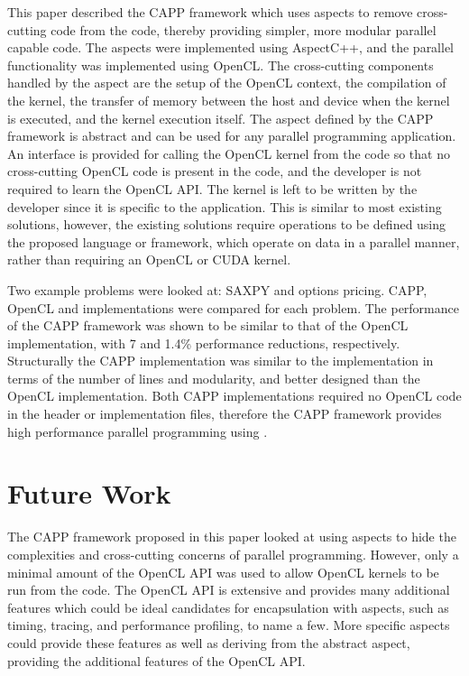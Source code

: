 \documentclass{sig-alternate-05-2015}
\begin{document}
This paper described the  CAPP framework which uses aspects to remove
cross-cutting code from the \CPP code, thereby providing simpler, more modular
parallel capable \CPP code. The aspects were implemented using AspectC++,
and the parallel functionality was implemented using OpenCL. The cross-cutting 
components handled by the aspect are the setup of the OpenCL
context, the compilation of the kernel, the transfer of memory between the 
host and device when the kernel is executed, and the kernel execution itself. 
The aspect defined by the  CAPP framework is abstract and can be used for 
any parallel programming application. An interface is provided for calling the 
OpenCL kernel from the \CPP code so that no cross-cutting OpenCL code is present in
the \CPP code, and the developer is not required to learn the OpenCL API. The
kernel is left to be written by the developer since it is specific to the
application. This is similar to most existing solutions, however, the existing
solutions require operations to be defined using the proposed language or
framework, which operate on data in a parallel manner, rather than requiring an
OpenCL or CUDA kernel.

Two example problems were looked at: SAXPY and options pricing. CAPP, OpenCL 
and \CPP implementations were compared for each problem. The performance of the 
 CAPP framework was shown to be similar to that of the OpenCL
implementation, with 7 and 1.4\% performance reductions, respectively. Structurally 
the CAPP implementation was similar 
to the \CPP  implementation in terms of the number of lines and modularity, and
better designed than the OpenCL implementation. Both CAPP implementations
required no OpenCL code in the \CPP header or implementation files, therefore the
 CAPP framework provides high performance parallel programming using \CPP.

\section{Future Work}\label{sec:future}

The  CAPP framework proposed in this paper looked at using aspects to hide
the complexities and cross-cutting concerns of parallel programming. However, only a
minimal amount of the OpenCL API was used to allow OpenCL kernels to be run from the
\CPP code. The OpenCL API is extensive and provides many additional features which 
could be ideal candidates for encapsulation with aspects, such as timing,
tracing, and performance profiling, to name a few. More specific aspects could
provide these features as well as deriving from the abstract aspect, providing
the additional features of the OpenCL API.
\end{document}
